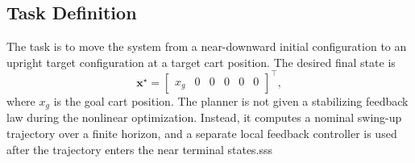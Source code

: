 \documentclass[conference]{IEEEtran}
\begin{document}
\subsection{Task Definition}
The task is to move the system from a near-downward initial configuration to an upright target configuration at a target cart position. The desired final state is
\begin{equation}
\bm{x}^{\star}
=
\begin{bmatrix}
x_g&0&0&0&0&0
\end{bmatrix}^{\top},
\end{equation}
where $x_g$ is the goal cart position. The planner is not given a stabilizing feedback law during the nonlinear optimization. Instead, it computes a nominal swing-up trajectory over a finite horizon, and a separate local feedback controller is used after the trajectory enters the near terminal states.sss

\end{document}

